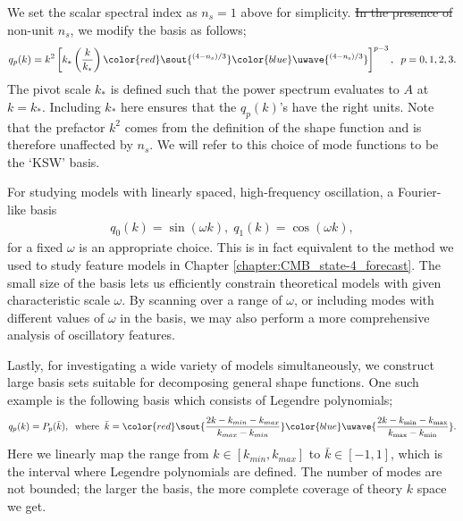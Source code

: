 \documentclass[a4paper,12pt,times,custombib,print,index]{Classes/PhDThesisPSnPDF} %
\providecommand{\DIFadd}[1]{{\protect\color{blue}\uwave{#1}}} %
\providecommand{\DIFdel}[1]{{\protect\color{red}\sout{#1}}}                      %
\providecommand{\DIFaddbegin}{} %
\providecommand{\DIFaddend}{} %
\providecommand{\DIFdelbegin}{} %
\providecommand{\DIFdelend}{} %
\newcommand{\DIFscaledelfig}{0.5}
\newlength{\DIFdelgraphicswidth} %
\newlength{\DIFdelgraphicsheight} %
\newcommand{\DIFaddincludegraphics}[2][]{{\color{blue}\fbox{\DIFOincludegraphics[#1]{#2}}}} %
\newcommand{\DIFdelincludegraphics}[2][]{%
\sbox{\DIFdelgraphicsbox}{\DIFOincludegraphics[#1]{#2}}%
\settoboxwidth{\DIFdelgraphicswidth}{\DIFdelgraphicsbox} %
\settoboxtotalheight{\DIFdelgraphicsheight}{\DIFdelgraphicsbox} %
\scalebox{\DIFscaledelfig}{%
\parbox[b]{\DIFdelgraphicswidth}{\usebox{\DIFdelgraphicsbox}\\[-\baselineskip] \rule{\DIFdelgraphicswidth}{0em}}\llap{\resizebox{\DIFdelgraphicswidth}{\DIFdelgraphicsheight}{%
\setlength{\unitlength}{\DIFdelgraphicswidth}%
\begin{picture}(1,1)%
\thicklines\linethickness{2pt} %
{\color[rgb]{1,0,0}\put(0,0){\framebox(1,1){}}}%
{\color[rgb]{1,0,0}\put(0,0){\line( 1,1){1}}}%
{\color[rgb]{1,0,0}\put(0,1){\line(1,-1){1}}}%
\end{picture}%
}\hspace*{3pt}}} %
} %
\DeclareRobustCommand{\DIFaddbegin}{\DIFOaddbegin \let\includegraphics\DIFaddincludegraphics} %
\DeclareRobustCommand{\DIFaddend}{\DIFOaddend \let\includegraphics\DIFOincludegraphics} %
\DeclareRobustCommand{\DIFdelbegin}{\DIFOdelbegin \let\includegraphics\DIFdelincludegraphics} %
\DeclareRobustCommand{\DIFdelend}{\DIFOaddend \let\includegraphics\DIFOincludegraphics} %
\begin{document}
We set the scalar spectral index as \DIFdelbegin \DIFdel{$n_s = 1$ }\DIFdelend \DIFaddbegin \DIFadd{$n_\text{s} = 1$ }\DIFaddend above for simplicity. \DIFdelbegin \DIFdel{In the presence of }\DIFdelend \DIFaddbegin \DIFadd{For a }\DIFaddend non-unit \DIFdelbegin \DIFdel{$n_s$}\DIFdelend \DIFaddbegin \DIFadd{$n_\text{s}$}\DIFaddend , we modify the basis as follows;
\begin{align}
	q_p(k) = k^2 \left[ k_* \left( \frac{k}{k_*} \right)\DIFdelbegin \DIFdel{^{(4-n_s)/3} }\DIFdelend \DIFaddbegin \DIFadd{^{(4-n_\text{s})/3} }\DIFaddend \right]^{p-3}, \;\; p=0,1,2,3. \label{eqn:KSW_basis}
\end{align}
The pivot scale $k_*$ is defined such that the power spectrum evaluates to $A$ at $k=k_*$. Including $k_*$ here ensures that the $q_p(k)$'s have the right units. Note that the prefactor $k^2$ comes from the definition of the shape function and is therefore unaffected by \DIFdelbegin \DIFdel{$n_s$}\DIFdelend \DIFaddbegin \DIFadd{$n_\text{s}$}\DIFaddend . We will refer to this choice of mode functions to be the `KSW' basis.

For studying models with linearly spaced, high-frequency oscillation, a Fourier-like basis
\begin{align}
	q_0(k) = \sin (\omega k), \; q_1(k) = \cos (\omega k), \label{eqn:Fourier_basis}
\end{align}
for a fixed $\omega$ is an appropriate choice. This is in fact equivalent to the method we used to study feature models in Chapter \ref{chapter:CMB_state-4_forecast}. The small size of the basis lets us efficiently constrain theoretical models with given characteristic scale $\omega$. By scanning over a range of $\omega$, or including modes with different values of $\omega$ in the basis, we may also perform a more comprehensive analysis of oscillatory features.

Lastly, for investigating a wide variety of models simultaneously, we construct large basis sets suitable for decomposing general shape functions. One such example is the following basis which consists of Legendre polynomials;
\begin{align}
	q_p(k) = P_p(\bar{k}), \;\;\text{where}\;\; \bar{k} = \DIFdelbegin \DIFdel{\frac{2k-k_{min}-k_{max}}{k_{max}-k_{min}}}\DIFdelend \DIFaddbegin \DIFadd{\frac{2k-k_\text{min}-k_\text{max}}{k_\text{max}-k_\text{min}}}\DIFaddend .  \label{eqn:Legendre_basis_no_inv_k}
\end{align}
Here we linearly map the range from \DIFdelbegin \DIFdel{$k \in [k_{min},k_{max}]$ }\DIFdelend \DIFaddbegin \DIFadd{$k \in [k_\text{min},k_\text{max}]$ }\DIFaddend to $\bar{k} \in [-1,1]$, which is the interval where Legendre polynomials are defined. The number of modes are not bounded; the larger the basis, the more complete coverage of theory $k$ space we get.
\end{document}

